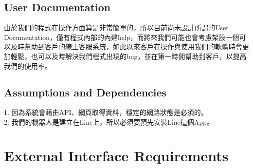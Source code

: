 \documentclass{scrreprt}
\begin{document}
\begin{CJK}{UTF8}{bkai}
\section{User Documentation}
由於我們的程式在操作方面算是非常簡單的，所以目前尚未設計所謂的User Documentation，僅有程式內部的內建help，而將來我們可能也會考慮架設一個可以及時幫助到客戶的線上客服系統，如此以來客戶在操作與使用我們的軟體時會更加輕鬆，也可以及時解決我們程式出現的bug，並在第一時間幫助到客戶，以提高我們的使用率。

\section{Assumptions and Dependencies}
1.  因為系統會藉由API、網頁取得資料，穩定的網路狀態是必須的。\\
2.  我們的機器人是建立在Line上，所以必須要預先安裝Line這個App。\\


\chapter{External Interface Requirements}


\end{CJK}
\end{document}
